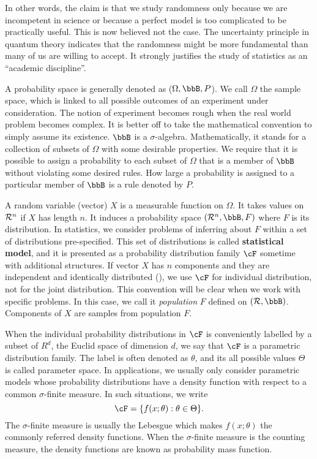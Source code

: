 In other words, the claim is that we study randomness
only because we are incompetent in science or 
because a perfect model is too complicated to be practically useful.
This is now believed not the case.
The uncertainty principle in quantum theory indicates that the randomness
might be more fundamental than many of us are willing to accept.
It strongly justifies the study of statistics as an ``academic discipline''.

A probability space is generally denoted as ($\Omega, \bbB, P$).
We call $\Omega$ the sample space, which is linked to all possible
outcomes of an experiment under consideration. The notion of
experiment becomes rough when the real world problem becomes
complex. It is better off to take the mathematical convention to
simply assume its existence. $\bbB$ is a $\sigma$-algebra.
Mathematically, it stands for a collection of subsets of $\Omega$
with some desirable properties. We require that it is possible
to assign a probability to each subset of $\Omega$ that is a member
of $\bbB$ without violating some desired rules. 
How large a probability is assigned to a particular
member of $\bbB$ is a rule denoted by $P$.

A random variable (vector) $X$ is a measurable function on $\Omega$.
It takes values on ${\cal R}^n$ if $X$ has length $n$. It induces
a probability space $({\cal R}^n, \bbB, F)$ where $F$ is its distribution.
In statistics, we consider problems of inferring about $F$ within
a set of distributions pre-specified.
This set of distributions is called {\bf statistical model},
and it is presented as a probability distribution family
$\cF$ sometime with additional structures. 
If vector $X$ has $n$ components and they are
independent and identically distributed (\iid), we use $\cF$
for individual distribution, not for the joint distribution.
This convention will be clear when we work with specific problems.
In this case, we call it {\it population} $F$ defined on $({\cal R}, \bbB)$. 
Components of $X$ are samples from population $F$. 

When the individual probability distributions in $\cF$ is
conveniently labelled by a subset of $R^d$, the Euclid space of
dimension $d$, we say that $\cF$ is a parametric distribution family.
The label is often denoted as $\theta$, and its all possible values
$\Theta$ is called parameter space. In applications, we usually
only consider parametric models whose probability distributions
have a density function with respect to a common $\sigma$-finite
measure. In such situations, we write
\[
\cF = \{ f(x; \theta): \theta \in \Theta \}.
\]
The $\sigma$-finite measure is usually the Lebesgue which
makes $f(x; \theta)$ the commonly referred density functions.
When the $\sigma$-finite measure is the counting measure,
the density functions are known as probability mass function.

